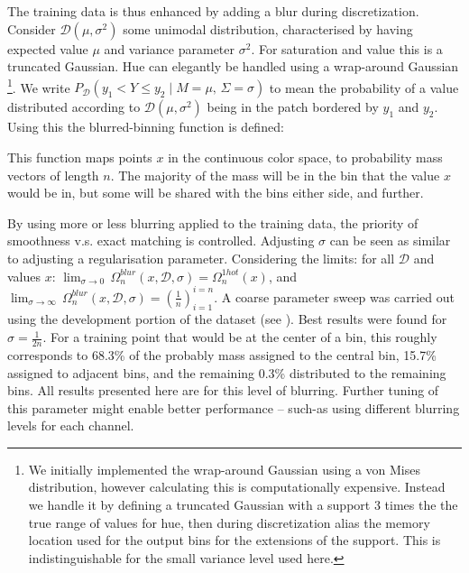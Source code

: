 \documentclass[11pt,letterpaper, twocolumn]{article}
\newcommand{\compactmath}[1]{\noindent\resizebox{\columnwidth}{!}{$#1$}}
\begin{document}
The training data is thus enhanced by adding a blur during discretization.
Consider $\mathcal{D}(\mu,\sigma^{2})$ some unimodal distribution, characterised by having expected value $\mu$ and variance parameter $\sigma^{2}$.
For saturation and value this is a truncated Gaussian.
Hue can elegantly be handled using a wrap-around Gaussian%
\footnote{We initially implemented the wrap-around Gaussian using 
 a von Mises distribution, however calculating this is computationally expensive.
Instead we handle it by defining a truncated Gaussian with a support 3 times the the true range of values for hue, then during discretization alias the memory location used for the output bins for the extensions of the support.
This is indistinguishable for the small variance level used here.}.
We write $P_{\mathcal{D}}(y_{1}<Y\le y_{2}\mid M=\mu,\,\Sigma=\sigma)$ to mean the probability of a value distributed according to $\mathcal{D}(\mu,\sigma^{2})$ being in the patch bordered by $y_1$ and $y_2$.
Using this the blurred-binning function is defined: 

\compactmath{\Omega_{n}^{blur}(x,\mathcal{D},\sigma)=\left(P_{\mathcal{D}}\left(\dfrac{i-1}{n}<Y\le\dfrac{i}{n}\mid M=x,\,\Sigma=\sigma\right)\right)_{i=1}^{i=n}}
This function maps points $x$ in the continuous color space, to probability mass vectors of length $n$.
The majority of the mass will be in the bin that the value $x$ would be in,
but some will be shared with the bins either side, and further.

By using more or less blurring applied to the training data, the priority of smoothness v.s. exact matching is controlled.
Adjusting $\sigma$ can be seen as similar to adjusting a regularisation parameter.
Considering the limits:
for all $\mathcal{D}$ and values $x$: 
\mbox{$\lim_{\sigma \to 0}\, \Omega_n^{blur}(x, \mathcal{D}, \sigma) = \Omega_n^{1hot}(x)$},
and \mbox{$\lim_{\sigma \to \infty}\, \Omega_n^{blur}(x, \mathcal{D}, \sigma) =  \left(\frac{1}{n}\right)_{i=1}^{i=n}$}.
A coarse parameter sweep was carried out using the development portion of the dataset (see ).
Best results were found for $\sigma = \frac{1}{2n}$.
For a training point that would be at the center of a bin, this roughly corresponds to 68.3\% of the probably mass assigned to the central bin, 15.7\% assigned to adjacent bins, and the remaining 0.3\% distributed to the remaining bins.
All results presented here are for this level of blurring.
Further tuning of this parameter might enable better performance -- such-as using different blurring levels for each channel.
\end{document}
